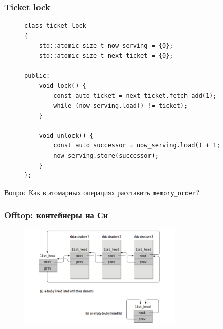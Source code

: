 \documentclass[aspectratio=169, pdf, 8pt, unicode]{beamer}
\begin{document}
\begin{frame}[fragile]
\frametitle{Ticket lock}
\begin{figure}[H]
\centering
\begin{minipage}{0.8\textwidth}
\begin{verbatim}
class ticket_lock
{
    std::atomic_size_t now_serving = {0};
    std::atomic_size_t next_ticket = {0};

public:
    void lock() {
        const auto ticket = next_ticket.fetch_add(1);
        while (now_serving.load() != ticket);
    }

    void unlock() {
        const auto successor = now_serving.load() + 1;
        now_serving.store(successor);
    }
};
\end{verbatim}
\end{minipage}
\end{figure}
\begin{block}{Вопрос}
Как в атомарных операциях расставить \texttt{memory\_order}?
\end{block}
\end{frame}

\begin{frame}[fragile]
\frametitle{Offtop: контейнеры на Си}
\begin{figure}[H]
\centering
\includegraphics[width=0.7\textwidth]{fig/linux-list.png}
\end{figure}
\end{frame}
\end{document}
